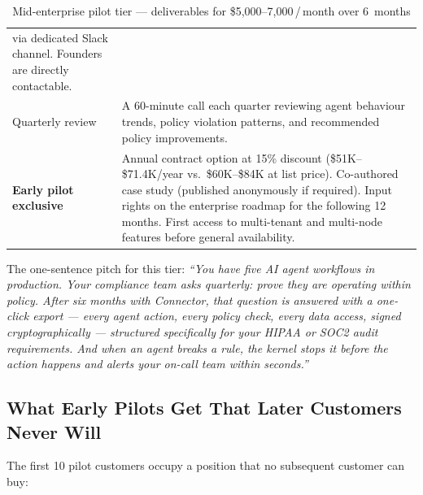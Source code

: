 \begin{table}[H]
\begin{tabularx}{\textwidth}{@{}lX@{}}
  via dedicated Slack channel. Founders are directly contactable. \\
Quarterly review & A 60-minute call each quarter reviewing agent behaviour
  trends, policy violation patterns, and recommended policy improvements. \\
\midrule
\textbf{Early pilot exclusive} & Annual contract option at 15\% discount
  (\$51K--\$71.4K/year vs.\ \$60K--\$84K at list price). Co-authored case
  study (published anonymously if required). Input rights on the enterprise
  roadmap for the following 12 months. First access to multi-tenant and
  multi-node features before general availability. \\
\bottomrule
\end{tabularx}
\caption{Mid-enterprise pilot tier --- deliverables for \$5,000--7,000\,/\,month over 6~months}
\end{table}

\noindent The one-sentence pitch for this tier: \emph{``You have five AI
agent workflows in production. Your compliance team asks quarterly: prove
they are operating within policy. After six months with Connector, that
question is answered with a one-click export --- every agent action, every
policy check, every data access, signed cryptographically --- structured
specifically for your HIPAA or SOC2 audit requirements. And when an agent
breaks a rule, the kernel stops it before the action happens and alerts your
on-call team within seconds.''}

\subsection*{What Early Pilots Get That Later Customers Never Will}

The first 10 pilot customers occupy a position that no subsequent customer
can buy:


